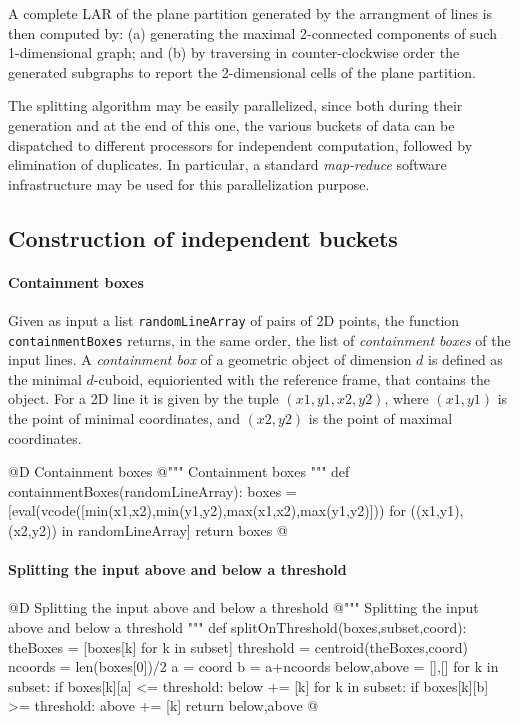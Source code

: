 \documentclass[11pt,oneside]{article}    %
\begin{document}
A complete LAR of the plane partition generated by the arrangment of lines is then computed by: (a) generating the maximal 2-connected components of such 1-dimensional graph; and (b) by traversing in counter-clockwise order the generated subgraphs to report the 2-dimensional cells of the plane partition.

The splitting algorithm may be easily parallelized, since both during their generation and at the end of this one, the various buckets of data can be dispatched to different processors for independent computation, followed by elimination of duplicates. In particular, a standard \emph{map-reduce} software infrastructure may be used for this parallelization purpose.


\subsection{Construction of independent buckets}


\paragraph{Containment boxes}

Given as input a list \texttt{randomLineArray} of pairs of 2D points, the function \texttt{containmentBoxes} returns, in the same order, the list of \emph{containment boxes} of the input lines. A \emph{containment box} of a geometric object of dimension $d$ is defined as the minimal $d$-cuboid, equioriented with the reference frame, that contains the object. For a 2D line it is given by the tuple $(x1,y1,x2,y2)$, where $(x1,y1)$ is the point of minimal coordinates, and $(x2,y2)$ is the point of maximal  coordinates.

@D Containment boxes
@{""" Containment boxes """
def containmentBoxes(randomLineArray):
    boxes = [eval(vcode([min(x1,x2),min(y1,y2),max(x1,x2),max(y1,y2)]))
            for ((x1,y1),(x2,y2)) in randomLineArray]
    return boxes
@}



\paragraph{Splitting the input above and below a threshold}
@D Splitting the input above and below a threshold
@{""" Splitting the input above and below a threshold """
def splitOnThreshold(boxes,subset,coord):
    theBoxes = [boxes[k] for k in subset]
    threshold = centroid(theBoxes,coord)
    ncoords = len(boxes[0])/2
    a = coord%
    b = a+ncoords
    below,above = [],[]
    for k in subset:
        if boxes[k][a] <= threshold: below += [k]
    for k in subset:
        if boxes[k][b] >= threshold: above += [k]
    return below,above
@}
\end{document}
